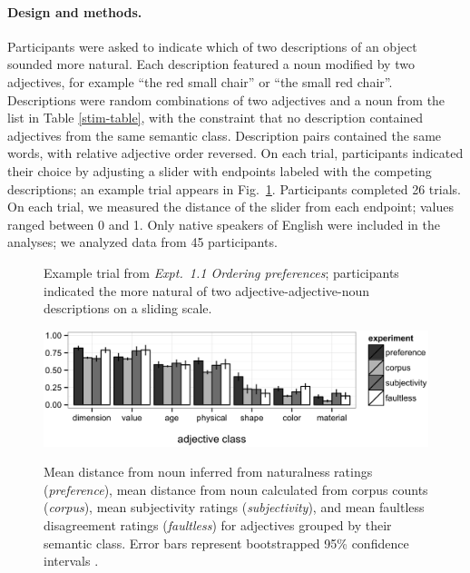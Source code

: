 \documentclass[12pt]{article}
\begin{document}
\paragraph{Design and methods.} Participants were asked to indicate which of two descriptions of an object sounded more natural. Each description featured a noun modified by two adjectives, for example ``the red small chair'' or ``the small red chair''. Descriptions were random combinations of two adjectives and a noun from the list in Table \ref{stim-table}, with the constraint that no description contained adjectives from the same semantic class. Description pairs contained the same words, with relative adjective order reversed. 
On each trial, participants indicated their choice by adjusting a slider with endpoints labeled with the competing descriptions; an example trial appears in Fig.\ \ref{order-trial}. Participants completed 26 trials. On each trial, we measured the distance of the slider from each endpoint; values ranged between 0 and 1. Only native speakers of English 
were included in the analyses; we analyzed data from 45 participants. 

\begin{figure}[h]
	\centering
	\caption{Example trial from \emph{Expt.\ 1.1 Ordering preferences}; participants indicated the more natural of two adjective-adjective-noun descriptions on a sliding scale.}\label{order-trial}
\end{figure}

\begin{figure}[tbh]
	\centering
	{\includegraphics[width=.75\linewidth]{plots/expt_results-new.eps}}\par
	\caption{Mean distance from noun inferred from naturalness ratings (\emph{preference}), mean distance from noun calculated from corpus counts (\emph{corpus}), mean subjectivity ratings (\emph{subjectivity}), and mean faultless disagreement ratings (\emph{faultless}) for adjectives grouped by their semantic class. Error bars represent bootstrapped 95\% confidence intervals 
	\citep{DiCiccio1996}.}\label{results}
\end{figure}
\end{document}
